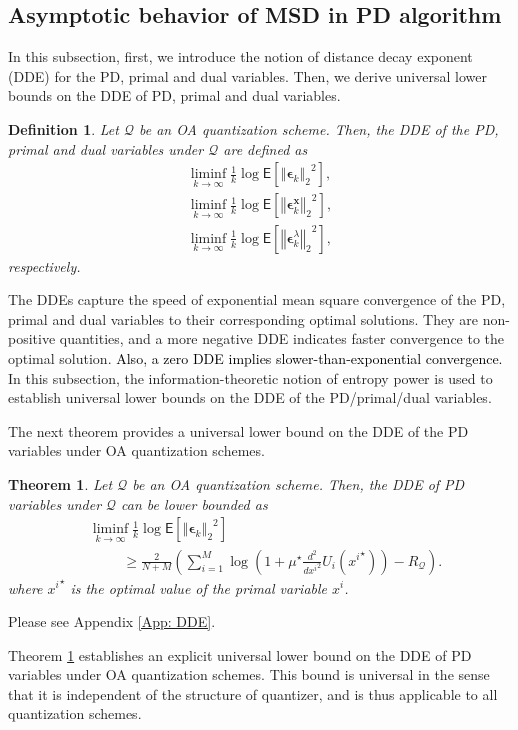 \documentclass[10pt,twocolumn,twoside]{IEEEtran}
\newtheorem{theorem}{Theorem}
\newtheorem{definition}{Definition}
\begin{document}
\subsection{Asymptotic behavior of MSD in PD algorithm}
In this subsection, first, we introduce the notion of distance decay exponent (DDE) for the PD, primal and dual variables.  Then, we derive universal lower bounds on the DDE of PD, primal and dual variables.
\begin{definition}
Let $\mathcal{Q}$ be an OA quantization scheme. Then, the DDE of the PD, primal and dual variables under $\mathcal{Q}$ are  defined as
\begin{eqnarray}
\liminf_{k\rightarrow\infty}\frac{1}{k}\log{\ensuremath{\mathsf{E}\left[{{\left\Vert{{\ensuremath{\boldsymbol{{\epsilon}}}}_k}\right\Vert_{{2}}}^2} \right]}},\nonumber\\
\liminf_{k\rightarrow\infty}\frac{1}{k}\log{\ensuremath{\mathsf{E}\left[{{\left\Vert{{\ensuremath{\boldsymbol{{\epsilon}}}}_k^{{\ensuremath{\boldsymbol{{x}}}}}}\right\Vert_{{2}}}^2} \right]}},\nonumber\\
\liminf_{k\rightarrow\infty}\frac{1}{k}\log{\ensuremath{\mathsf{E}\left[{{\left\Vert{{\ensuremath{\boldsymbol{{\epsilon}}}}_k^{\lambda}}\right\Vert_{{2}}}^2} \right]}},\nonumber
\end{eqnarray}
respectively.
\end{definition}
The DDEs capture the  speed of exponential mean square convergence of the PD, primal and dual variables to their corresponding optimal solutions. They are non-positive quantities, and a more negative DDE indicates faster convergence to the optimal solution. \textcolor{black}{Also, a zero DDE implies slower-than-exponential convergence.} In this subsection, the information-theoretic notion of entropy power is used to establish universal lower bounds on the DDE of the PD/primal/dual variables. 

The next theorem provides a universal lower bound on the  DDE of the PD variables under OA quantization schemes.
\begin{theorem}\label{Theo: DDE}
Let  $\mathcal{Q}$  be an OA quantization scheme. Then, the DDE of PD variables under $\mathcal{Q}$ can be lower bounded as
\begin{align}
&\liminf_{k\rightarrow\infty}\frac{1}{k}\log{\ensuremath{\mathsf{E}\left[{{\left\Vert{{\ensuremath{\boldsymbol{{\epsilon}}}}_k}\right\Vert_{{2}}}^2} \right]}}\nonumber\\
&\hspace{1cm}\geq\frac{2}{N+M}{\left({\sum_{i=1}^M\log{\left({1+\mu^\star \frac{d^2}{d {x^i}^2}U_i{\left({{x^i}^\star}\right)}}\right)}-R_{\mathcal{Q}}}\right)}.
\end{align}
where ${x^i}^\star$ is the optimal value of the primal variable $x^i$.
\end{theorem}
\begin{IEEEproof}
Please see Appendix \ref{App: DDE}.
\end{IEEEproof}
Theorem \ref{Theo: DDE} establishes an explicit universal lower bound on the DDE of PD variables under OA quantization schemes. 
This bound is universal in the sense that it is independent of the structure of quantizer, and is thus applicable to all quantization schemes.
\end{document}
